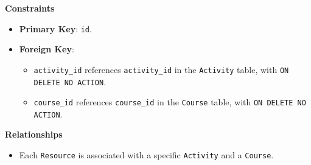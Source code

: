 \documentclass{article}
\begin{document}
\noindent
\textbf{Constraints}
\begin{itemize}
    \item \textbf{Primary Key}: \texttt{id}.
    \item \textbf{Foreign Key}: 
    \begin{itemize}
        \item \texttt{activity\_id} references \texttt{activity\_id} in the \texttt{Activity} table, with \texttt{ON DELETE NO ACTION}.
        \item \texttt{course\_id} references \texttt{course\_id} in the \texttt{Course} table, with \texttt{ON DELETE NO ACTION}.
    \end{itemize}
\end{itemize}

\noindent
\textbf{Relationships}
\begin{itemize}
    \item Each \texttt{Resource} is associated with a specific \texttt{Activity} and a \texttt{Course}.
\end{itemize}
\end{document}
